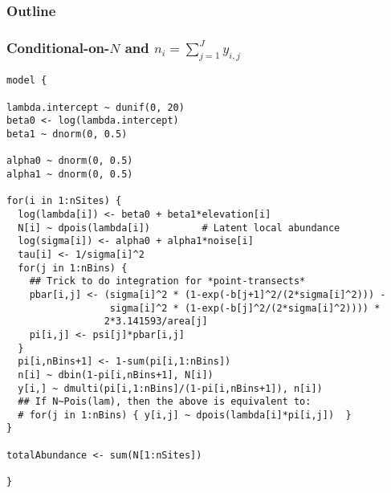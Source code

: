\documentclass[color=usenames,dvipsnames]{beamer}\usepackage[]{graphicx}\usepackage[]{color}
\makeatletter
\newenvironment{kframe}{%
 \def\at@end@of@kframe{}%
 \ifinner\ifhmode%
  \def\at@end@of@kframe{\end{minipage}}%
  \begin{minipage}{\columnwidth}%
 \fi\fi%
 \def\FrameCommand##1{\hskip\@totalleftmargin \hskip-\fboxsep
 \colorbox{shadecolor}{##1}\hskip-\fboxsep
     \hskip-\linewidth \hskip-\@totalleftmargin \hskip\columnwidth}%
 \MakeFramed {\advance\hsize-\width
   \@totalleftmargin\z@ \linewidth\hsize
   \@setminipage}}%
 {\par\unskip\endMakeFramed%
 \at@end@of@kframe}
\newenvironment{knitrout}{}{} %
\makeatother
\begin{document}
\begin{frame}
  \frametitle{Outline}
  \Large
\end{frame}



\begin{frame}[fragile]
  \frametitle{\normalsize Conditional-on-$N$ and $n_i=\sum_{j=1}^{J} y_{i,j}$}
\vspace{-3pt}
\begin{knitrout}\tiny
{}\color{fgcolor}\begin{kframe}
\begin{verbatim}
model {

lambda.intercept ~ dunif(0, 20)
beta0 <- log(lambda.intercept)
beta1 ~ dnorm(0, 0.5)

alpha0 ~ dnorm(0, 0.5)
alpha1 ~ dnorm(0, 0.5)

for(i in 1:nSites) {
  log(lambda[i]) <- beta0 + beta1*elevation[i]
  N[i] ~ dpois(lambda[i])         # Latent local abundance
  log(sigma[i]) <- alpha0 + alpha1*noise[i]
  tau[i] <- 1/sigma[i]^2
  for(j in 1:nBins) {
    ## Trick to do integration for *point-transects*
    pbar[i,j] <- (sigma[i]^2 * (1-exp(-b[j+1]^2/(2*sigma[i]^2))) -
                  sigma[i]^2 * (1-exp(-b[j]^2/(2*sigma[i]^2)))) * 
                 2*3.141593/area[j]
    pi[i,j] <- psi[j]*pbar[i,j]
  }
  pi[i,nBins+1] <- 1-sum(pi[i,1:nBins])
  n[i] ~ dbin(1-pi[i,nBins+1], N[i])
  y[i,] ~ dmulti(pi[i,1:nBins]/(1-pi[i,nBins+1]), n[i])
  ## If N~Pois(lam), then the above is equivalent to:
  # for(j in 1:nBins) { y[i,j] ~ dpois(lambda[i]*pi[i,j])  }
}

totalAbundance <- sum(N[1:nSites])

}
\end{verbatim}
\end{kframe}
\end{knitrout}
\end{frame}
\end{document}
